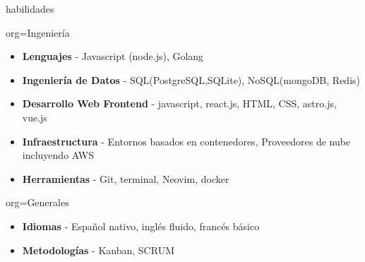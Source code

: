 \documentclass{resume}
\begin{document}
\makeheader

\begin{ResumeSection}{habilidades}
    \newcommand{\skill}[2]{\textbf{#1} - #2}
    \begin{ResumeSubsection}{org=Ingeniería}
        \begin{itemize}
            \item \skill{Lenguajes}{Javascript (node.js), Golang}
            \item \skill{Ingeniería de Datos}{SQL(PostgreSQL,SQLite), NoSQL(mongoDB, Redis)}
            \item \skill{Desarrollo Web Frontend}{javascript, react.js, HTML, CSS, astro.js, vue.js}
            \item \skill{Infraestructura}{Entornos basados en contenedores, Proveedores de nube incluyendo AWS}
            \item \skill{Herramientas}{Git, terminal, Neovim, docker}
        \end{itemize}
    \end{ResumeSubsection}
    \begin{ResumeSubsection}{org=Generales}
        \begin{itemize}
            \item \skill{Idiomas}{Español nativo, inglés fluido, francés básico}
            \item \skill{Metodologías}{Kanban, SCRUM}
        \end{itemize}
    \end{ResumeSubsection}
\end{ResumeSection}
\end{document}
